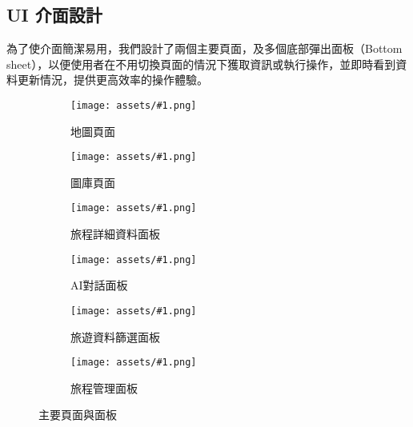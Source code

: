 
\subsection{UI 介面設計}

為了使介面簡潔易用，我們設計了兩個主要頁面，及多個底部彈出面板（Bottom sheet），以便使用者在不用切換頁面的情況下獲取資訊或執行操作，並即時看到資料更新情況，提供更高效率的操作體驗。

\newcommand{\customsubfig}[2]{
    \hspace{0.005\textwidth}
    \begin{subfigure}[t]{0.13\textwidth}
        \centering
        \texttt{[image: assets/\#1.png]}
        \caption{#2}
        \label{#2}
    \end{subfigure}
    \hspace{0.005\textwidth}
}

\begin{figure}[H]
    \centering
    \customsubfig{地圖頁面}{地圖頁面}
    \customsubfig{圖庫頁面}{圖庫頁面}
    \customsubfig{旅程詳細資料面板-統計資料}{旅程詳細資料面板}
    \customsubfig{AI對話面板-聊天}{AI對話面板}
    \customsubfig{旅遊資料篩選面板}{旅遊資料篩選面板}
    \customsubfig{旅程管理面板}{旅程管理面板}

    \caption{主要頁面與面板}
    \label{主要頁面與面板}
\end{figure}

\let\customsubfig\relax

